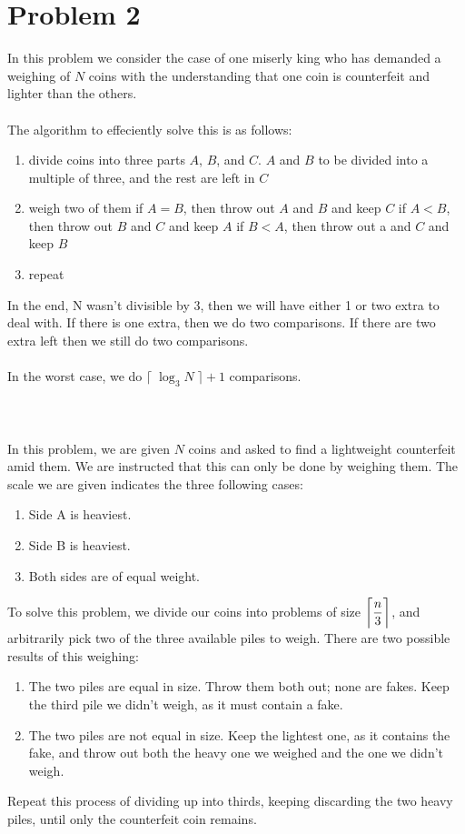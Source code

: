 \section*{Problem 2}

In this problem we consider the case of one miserly king who has 
demanded a weighing of $N$ coins with the understanding that one coin
is counterfeit and lighter than the others. 
\\
\\
The algorithm to effeciently solve this is as follows:
\begin{enumerate}[noitemsep]
    \item divide coins into three parts $A$, $B$, and $C$. $A$ and $B$
          to be divided into a multiple of three, and the rest are left
          in $C$ 
    \item weigh two of them
    \subitem if $A = B$,  then throw out $A$ and $B$ and keep $C$
    \subitem if $A < B$, then throw out $B$ and $C$ and keep $A$
    \subitem if $B < A$, then throw out a and $C$ and keep $B$
    \item repeat
\end{enumerate} 

In the end, N wasn't divisible by 3, then we will have either 1 or two 
extra to deal with. If there is one extra, then we do two comparisons. 
If there are two extra left then we still do two comparisons.
\\
\\
In the worst case, we do $\lceil \; \log_3 N \; \rceil + 1$ comparisons.
\\
\\
{}
\\
\\
In this problem, we are given $N$ coins and asked to find a lightweight counterfeit amid them. We are instructed that this can only be done by weighing them. The scale we are given indicates the three following cases:
\begin{enumerate}
    \item Side A is heaviest.
    \item Side B is heaviest.
    \item Both sides are of equal weight.
\end{enumerate}

To solve this problem, we divide our coins into problems of size $\ceil[\bigg]{\dfrac{n}{3}}$, and arbitrarily pick two of the three available piles to weigh. There are two possible results of this weighing:
\begin{enumerate}
    \item The two piles are equal in size. Throw them both out; none are fakes. Keep the third pile we didn't weigh, as it must contain a fake.
    \item The two piles are not equal in size. Keep the lightest one, as it contains the fake, and throw out both the heavy one we weighed and the one we didn't weigh.
\end{enumerate}
Repeat this process of dividing up into thirds, keeping discarding the two heavy piles, until only the counterfeit coin remains.
